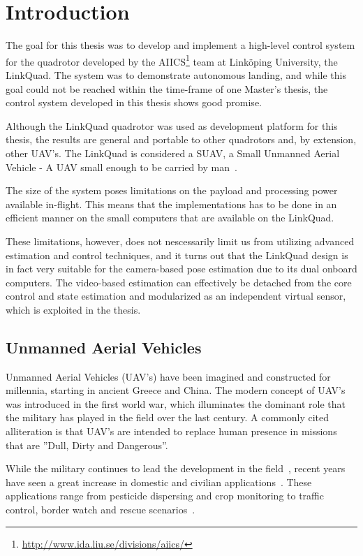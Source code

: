 \chapter{Introduction}
\label{cha:introduction}
    The goal for this thesis was to develop and implement a high-level control system
    for the quadrotor developed by the AIICS\footnote{\url{http://www.ida.liu.se/divisions/aiics/}} team at Linköping University, the LinkQuad.
    The system was to demonstrate autonomous landing, and while this goal
    could not be reached within the time-frame of one Master's thesis, the control
    system developed in this thesis shows good promise.

    Although the LinkQuad quadrotor was used as development platform for this thesis,
    the results are general and portable to other quadrotors and, by extension, other UAV's.
    The LinkQuad is considered a SUAV, a Small Unmanned Aerial Vehicle - A UAV small enough to be carried by man~\citep{wiki:suav}.

    The size of the system poses limitations on the payload and processing power
    available in-flight. This means that the implementations has to be done
    in an efficient manner on the small computers that are available on the LinkQuad.

    These limitations, however, does not nescessarily limit us from utilizing advanced estimation
    and control techniques, and it turns out that the LinkQuad design is in fact
    very suitable for the camera-based pose estimation due to its dual onboard computers.
    The video-based estimation can effectively be detached from the core control and state estimation
    and modularized as an independent virtual sensor, which is exploited in the
    thesis.

\section{Unmanned Aerial Vehicles}
    Unmanned Aerial Vehicles (UAV's) have been imagined and constructed for millennia, starting in ancient Greece and China\citep{valavanis2007advances}.
    The modern concept of UAV's was introduced in the first world war, which
    illuminates the dominant role that the military has played in the field over the
    last century. A commonly cited alliteration is that UAV's are intended to replace
    human presence in missions that are ''Dull, Dirty and Dangerous''.

    While the military continues to lead the development in the field~\citep{united2010u}, recent years
    have seen a great increase in domestic and civilian applications~\citep{Wong_Bil_2006}.
    These applications range from pesticide dispersing and crop monitoring to
    traffic control, border watch and rescue scenarios~\citep{Doherty_Rudol_2007}.

